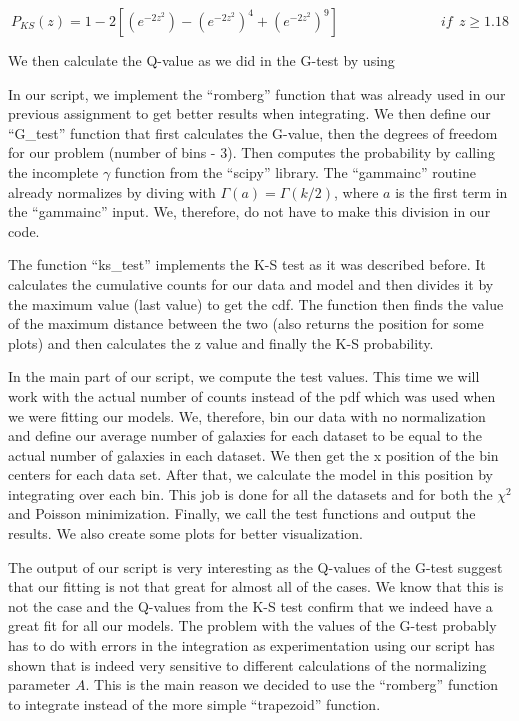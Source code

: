 \documentclass[a4paper,10pt]{article}
\begin{document}
\begin{equation}
  P_{KS}(z) = 1-2[(e^{-2z^2})-(e^{-2z^2})^4+(e^{-2z^2})^9] \:\:\:\:\:\:\:\:\:\:\:\:\:\:\:\:\:\:\:\:\:\:\:\:\:\:\:\:\:\:\:\:\: if \:\: z \ge 1.18
\end{equation}

We then calculate the Q-value as we did in the G-test by using 

In our script, we implement the ``romberg'' function that was already used in our previous assignment to get better results when integrating. We then define our ``G\_test'' function that first calculates the G-value, then the degrees of freedom for our problem (number of bins - 3). Then computes the probability by calling the incomplete $\gamma$ function from the ``scipy'' library. The ``gammainc'' routine already normalizes by diving with $\Gamma(a)=\Gamma(k/2)$, where $a$ is the first term in the ``gammainc'' input. We, therefore, do not have to make this division in our code. 

The function ``ks\_test'' implements the K-S test as it was described before. It calculates the cumulative counts for our data and model and then divides it by the maximum value (last value) to get the cdf. The function then finds the value of the maximum distance between the two (also returns the position for some plots) and then calculates the z value and finally the K-S probability. 



In the main part of our script, we compute the test values. This time we will work with the actual number of counts instead of the pdf which was used when we were fitting our models. We, therefore, bin our data with no normalization and define our average number of galaxies for each dataset to be equal to the actual number of galaxies in each dataset. We then get the x position of the bin centers for each data set. After that, we calculate the model in this position by integrating over each bin. This job is done for all the datasets and for both the $\chi^2$ and Poisson minimization. Finally, we call the test functions and output the results. We also create some plots for better visualization.



The output of our script is very interesting as the Q-values of the G-test suggest that our fitting is not that great for almost all of the cases. We know that this is not the case and the Q-values from the K-S test confirm that we indeed have a great fit for all our models. The problem with the values of the G-test probably has to do with errors in the integration as experimentation using our script has shown that is indeed very sensitive to different calculations of the normalizing parameter $A$. This is the main reason we decided to use the ``romberg'' function to integrate instead of the more simple ``trapezoid'' function. 
\end{document}
